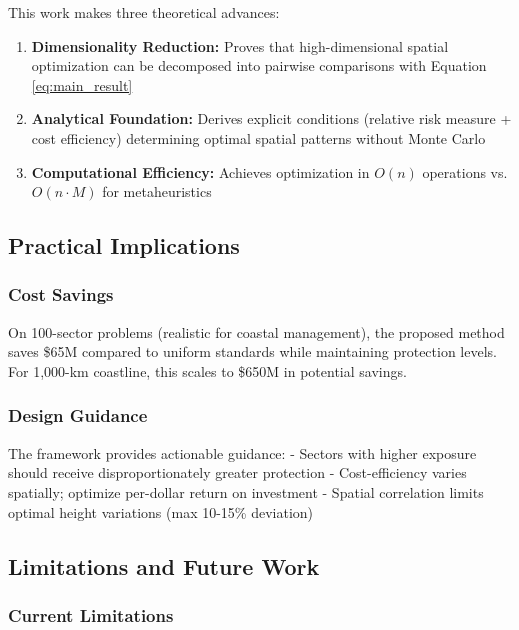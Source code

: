 \documentclass[3p,twocolumn]{elsarticle}
\begin{document}
This work makes three theoretical advances:

\begin{enumerate}
  \item \textbf{Dimensionality Reduction:} Proves that high-dimensional spatial optimization can be decomposed into pairwise comparisons with Equation \eqref{eq:main_result}

  \item \textbf{Analytical Foundation:} Derives explicit conditions (relative risk measure + cost efficiency) determining optimal spatial patterns without Monte Carlo

  \item \textbf{Computational Efficiency:} Achieves optimization in $O(n)$ operations vs. $O(n \cdot M)$ for metaheuristics
\end{enumerate}

\subsection{Practical Implications}

\subsubsection{Cost Savings}
On 100-sector problems (realistic for coastal management), the proposed method saves \$65M compared to uniform standards while maintaining protection levels. For 1,000-km coastline, this scales to \$650M in potential savings.

\subsubsection{Design Guidance}
The framework provides actionable guidance:
- Sectors with higher exposure should receive disproportionately greater protection
- Cost-efficiency varies spatially; optimize per-dollar return on investment
- Spatial correlation limits optimal height variations (max 10-15\% deviation)

\subsection{Limitations and Future Work}

\subsubsection{Current Limitations}
\end{document}
